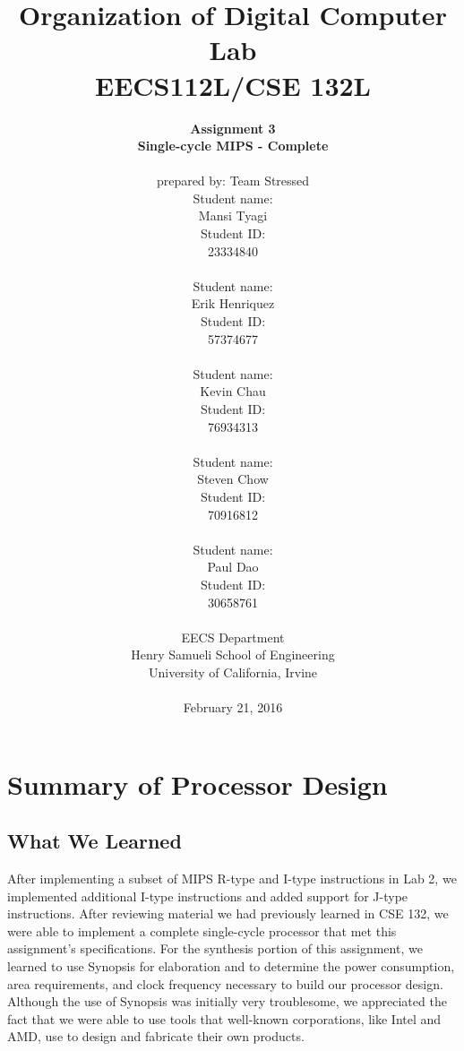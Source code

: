 \documentclass{article}
\begin{document}
\title{Organization of Digital Computer Lab \\ EECS112L/CSE 132L}
\author{\textbf{Assignment 3 }\\ \textbf{Single-cycle MIPS - Complete} \\ \\
prepared by: Team Stressed \\ Student name: \\ Mansi Tyagi \\ Student ID: \\23334840\\ \\ Student name: \\ Erik Henriquez\\ Student ID: \\57374677\\ \\ Student name: \\ Kevin Chau \\ Student ID: \\76934313\\ \\ Student name: \\ Steven Chow\\Student ID: \\70916812\\ \\ Student name: \\ Paul Dao \\Student ID: \\30658761\\ \\
EECS Department\\ Henry Samueli School of Engineering \\ University of California, Irvine \\ \\
{February 21, 2016}} 


\date{}
\maketitle


\section{Summary of Processor Design}
\subsection{What We Learned}
After implementing a subset of MIPS R-type and I-type instructions in Lab 2, we implemented additional I-type instructions and added support for J-type instructions. After reviewing material we had previously learned in CSE 132, we were able to implement a complete single-cycle processor that met this assignment's specifications. For the synthesis portion of this assignment, we learned to use Synopsis for elaboration and to determine the power consumption, area requirements, and clock frequency necessary to build our processor design. Although the use of Synopsis was initially very troublesome, we appreciated the fact that we were able to use tools that well-known corporations, like Intel and AMD, use to design and fabricate their own products.
\end{document}

